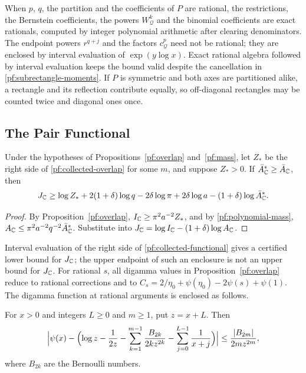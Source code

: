 When $p$, $q$, the partition and the coefficients of $P$ are rational,
the restrictions, the Bernstein coefficients, the powers
$W_{\mathcal Q}^k$ and the binomial coefficients are exact rationals,
computed by integer polynomial arithmetic after clearing denominators.
The endpoint powers $r^{q+j}$ and the factors $c_{\mathcal Q}^p$ need
not be rational; they are enclosed by interval evaluation of
$\exp(y\log x)$. Exact rational algebra followed by interval evaluation
keeps the bound valid despite the cancellation in
\eqref{pf:subrectangle-moments}. If $P$ is symmetric and both axes are
partitioned alike, a rectangle and its reflection contribute equally,
so off-diagonal rectangles may be counted twice and diagonal ones once.

\subsection{The Pair Functional}

\begin{corollary}\label{pf:functional}
Under the hypotheses of Propositions~\ref{pf:overlap} and~\ref{pf:mass},
let $Z_*$ be the right side of \eqref{pf:collected-overlap} for some
$m$, and suppose $Z_*>0$. If $\bar A_\mathbb C^*\ge\bar A_\mathbb C$, then
\begin{equation}\label{pf:collected-functional}
 J_\mathbb C\ge\log Z_*+2(1+\delta)\log q-2\delta\log\pi
 +2\delta\log a-(1+\delta)\log\bar A_\mathbb C^* .
\end{equation}
\end{corollary}

\begin{proof}
By Proposition~\ref{pf:overlap}, $I_\mathbb C\ge\pi^2a^{-2}Z_*$, and by
\eqref{pf:polynomial-mass}, $A_\mathbb C\le\pi^2a^{-2}q^{-2}\bar A_\mathbb C^*$.
Substitute into $J_\mathbb C=\log I_\mathbb C-(1+\delta)\log A_\mathbb C$.
\end{proof}

Interval evaluation of the right side of \eqref{pf:collected-functional}
gives a certified lower bound for $J_\mathbb C$; the upper endpoint of such an
enclosure is not an upper bound for $J_\mathbb C$. For rational $s$, all
digamma values in Proposition~\ref{pf:overlap} reduce to rational
corrections and to $C_s=2/\eta_0+\psi(\eta_0)-2\psi(s)+\psi(1)$. The
digamma function at rational arguments is enclosed as follows.

\begin{lemma}\label{pf:digamma}
For $x>0$ and integers $L\ge0$ and $m\ge1$, put $z=x+L$. Then
\[
 \Bigl|\psi(x)-\Bigl(\log z-\frac1{2z}
 -\sum_{k=1}^{m-1}\frac{B_{2k}}{2kz^{2k}}
 -\sum_{j=0}^{L-1}\frac1{x+j}\Bigr)\Bigr|
 \le\frac{|B_{2m}|}{2mz^{2m}},
\]
where $B_{2k}$ are the Bernoulli numbers.
\end{lemma}

